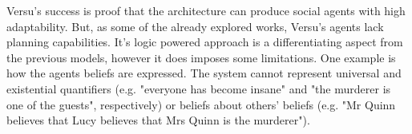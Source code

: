 Versu's success is proof that the architecture can produce social agents with high adaptability.
But, as some of the already explored works, Versu's agents lack planning capabilities.
It's logic powered approach is a differentiating aspect from the previous models, however it does imposes some limitations.
One example is how the agents beliefs are expressed.
The system cannot represent universal and existential quantifiers (e.g. "everyone has become insane" and "the murderer is one of the guests", respectively) or beliefs about others' beliefs (e.g. "Mr Quinn believes that Lucy believes that Mrs Quinn is the murderer").
